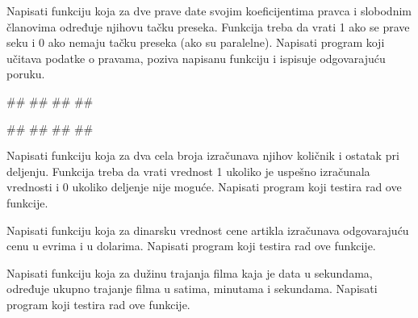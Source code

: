 \begin{Exercise}[label=v2.2_03] 
   Napisati funkciju koja za dve prave date svojim koeficijentima
   pravca i slobodnim članovima određuje njihovu tačku preseka. 
   Funkcija treba da vrati 1 ako se prave seku i 0 ako nemaju
   tačku preseka (ako su paralelne). Napisati program
   koji učitava podatke o pravama, poziva napisanu funkciju i 
   ispisuje odgovarajuću poruku.
   
\begin{miditest}
\begin{upotreba}{1}
#\naslovInt#
##
##
##
\end{upotreba}
\end{miditest}
\begin{miditest}
\begin{upotreba}{2}
#\naslovInt#
##
##
##
\end{upotreba}
\end{miditest}

\end{Exercise}
\ifresenja
\begin{Answer}[ref=v2.2_03]
\end{Answer}
 \fi

\begin{Exercise}[label=v2.xy] 
Napisati funkciju koja za dva cela broja izračunava njihov količnik i ostatak pri deljenju. Funkcija treba da vrati vrednost 1 ukoliko je uspešno izračunala vrednosti i 0 ukoliko deljenje nije moguće. Napisati program koji testira rad ove funkcije. 
\end{Exercise}

\begin{Exercise}[label=v2.xyz] 
Napisati funkciju koja za dinarsku vrednost cene artikla izračunava odgovarajuću cenu u evrima i u dolarima. Napisati program koji testira rad ove funkcije. 
\end{Exercise}

\begin{Exercise}[label=v2.xyz] 
Napisati funkciju koja za dužinu trajanja filma kaja je data u sekundama, određuje ukupno trajanje filma u satima, minutama i sekundama. Napisati program koji testira rad ove funkcije. 
\end{Exercise}



